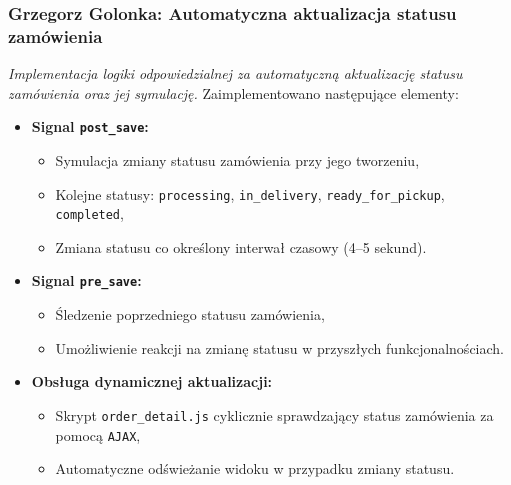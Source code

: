 \documentclass[12pt,a4paper,oneside]{article}
\theoremstyle{definition}
\numberwithin{equation}{section}
\begin{document}
\subsubsection{Grzegorz Golonka: Automatyczna aktualizacja statusu zamówienia}
\label{section:1.3.27}
\textit{
Implementacja logiki odpowiedzialnej za automatyczną aktualizację statusu zamówienia oraz jej symulację.
}
Zaimplementowano następujące elementy:
\begin{itemize}
    \item \textbf{Signal \texttt{post\_save}:}
    \begin{itemize}
        \item Symulacja zmiany statusu zamówienia przy jego tworzeniu,
        \item Kolejne statusy: \texttt{processing}, \texttt{in\_delivery}, \texttt{ready\_for\_pickup}, \texttt{completed},
        \item Zmiana statusu co określony interwał czasowy (4–5 sekund).
    \end{itemize}
    \item \textbf{Signal \texttt{pre\_save}:}
    \begin{itemize}
        \item Śledzenie poprzedniego statusu zamówienia,
        \item Umożliwienie reakcji na zmianę statusu w przyszłych funkcjonalnościach.
    \end{itemize}
    \item \textbf{Obsługa dynamicznej aktualizacji:}
    \begin{itemize}
        \item Skrypt \texttt{order\_detail.js} cyklicznie sprawdzający status zamówienia za pomocą \texttt{AJAX},
        \item Automatyczne odświeżanie widoku w przypadku zmiany statusu.
    \end{itemize}
\end{itemize}
% 
% 
\end{document}
